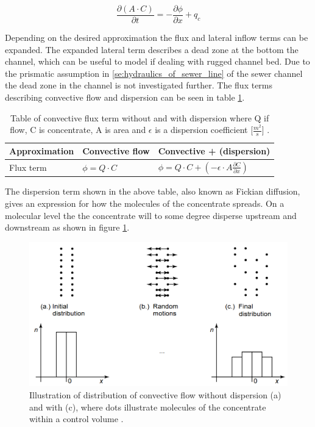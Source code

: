 \begin{equation}
	\frac{\partial (A\cdot C)}{\partial t} = - \frac{\partial \phi}{\partial x} + q_c 
\label{eq:concentrate_continuity_equation}
\end{equation}

Depending on the desired approximation the flux and lateral inflow terms can be expanded. The expanded lateral term describes a dead zone at the bottom the channel, which can be useful to model if dealing with rugged channel bed. Due to the prismatic assumption in \ref{se:hydraulics_of_sewer_line} of the sewer channel the dead zone in the channel is not investigated further. The flux terms describing convective flow and dispersion can be seen in table \ref{tab:flux_terms}.  

\begin{table}[H]
\centering
	\begin{tabular}{|l|l|l|} \hline
	Approximation 	& Convective flow &	Convective + (dispersion)  \\ \hline
	Flux term   	& $\phi = Q \cdot C$ & $ \phi = Q \cdot C + \left(- \epsilon \cdot A \frac{\partial C}{\partial x} \right)$  \\ \hline
  	\end{tabular} 
\caption{Table of convective flux term without and with dispersion where Q if flow, C is concentrate, A is area and $\epsilon$ is a dispersion coefficient [$\frac{m^2}{s}$] .}
\label{tab:flux_terms} 
\end{table}

The dispersion term shown in the above table, also known as Fickian diffusion, gives an expression for how the molecules of the concentrate spreads. On a molecular level the the concentrate will to some degree disperse upstream and downstream as shown in figure \ref{fig:diffusion_example}. 

\begin{figure}[H]
\centering
\includegraphics[width=.75\textwidth]{report/modeling/pictures/diffusion_example.png}
\caption{Illustration of distribution of convective flow without dispersion (a) and with (c), where dots illustrate molecules of the concentrate within a control volume \cite{karlruhe_con_def_dif_equation}.}
\label{fig:diffusion_example}
\end{figure} 

